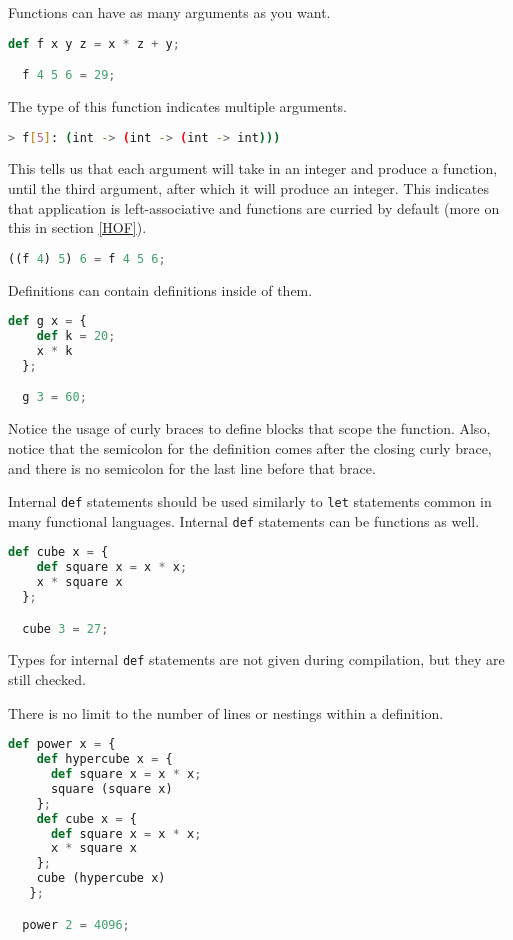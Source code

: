 Functions can have as many arguments as you want.

\begin{lstlisting}[language=Python]
  def f x y z = x * z + y;

  f 4 5 6 = 29;
\end{lstlisting}

The type of this function indicates multiple arguments.

\begin{lstlisting}[language=bash]
  > f[5]: (int -> (int -> (int -> int)))
\end{lstlisting}

This tells us that each argument will take in an integer and produce a function, until the third argument, after which it will produce an integer. This indicates that application is left-associative and functions are curried by default (more on this in section \ref{HOF}).

\begin{lstlisting}[language=Python]
  ((f 4) 5) 6 = f 4 5 6;
\end{lstlisting}

Definitions can contain definitions inside of them.

\begin{lstlisting}[language=Python]
  def g x = {
    def k = 20;
    x * k
  };

  g 3 = 60;
\end{lstlisting}

Notice the usage of curly braces to define blocks that scope the function. Also, notice that the semicolon for the definition comes after the closing curly brace, and there is no semicolon for the last line before that brace. 

Internal \lstinline{def} statements should be used similarly to \lstinline{let} statements common in many functional languages. Internal \lstinline{def} statements can be functions as well.

\begin{lstlisting}[language=Python]
  def cube x = {
    def square x = x * x;
    x * square x
  };

  cube 3 = 27;
\end{lstlisting}

Types for internal \lstinline{def} statements are not given during compilation, but they are still checked.

There is no limit to the number of lines or nestings within a definition. 

\begin{lstlisting}[language=Python]
  def power x = {
    def hypercube x = {
      def square x = x * x;
      square (square x)
    };
    def cube x = {
      def square x = x * x;
      x * square x
    };
    cube (hypercube x)
   };

  power 2 = 4096;
\end{lstlisting}

